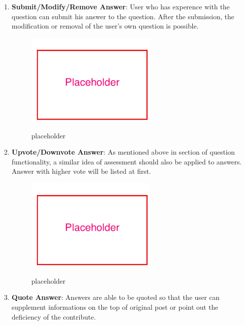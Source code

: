 \begin{enumerate}
\item
\textbf{Submit/Modify/Remove Answer}: User who has experence with the question can submit his answer to the question. After the submission, the modification or removal of the user's own question is possible.

\begin{figure}[!htbp]
  \caption{placeholder}
  \centering
    \includegraphics[width=0.6\textwidth]{Figures/placeholder.png}
  \label{fig:placeholder}
\end{figure}

\item
\textbf{Upvote/Downvote Answer}: As mentioned above in section of question functionality, a similar idea of assessment should also be applied to answers. Answer with higher vote will be listed at first.

\begin{figure}[!htbp]
  \caption{placeholder}
  \centering
    \includegraphics[width=0.6\textwidth]{Figures/placeholder.png}
  \label{fig:placeholder}
\end{figure}

\item
\textbf{Quote Answer}: Answers are able to be quoted so that the user can supplement informations on the top of original post or point out the deficiency of the contribute.


\end{enumerate}
